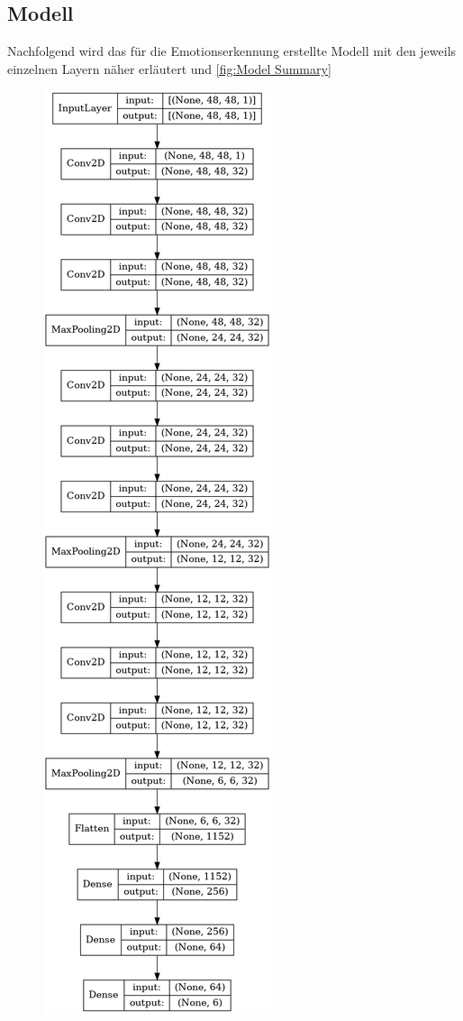 \documentclass[12pt, a4paper]{scrbook}
\begin{document}
\subsection{Modell}
Nachfolgend wird das für die Emotionserkennung erstellte Modell mit den jeweils einzelnen Layern näher erläutert und \ref{fig:Model Summary}
\begin{figure}[h]
\includegraphics[viewport=0 1177 300 1844]{Bilder/ModelSummary.png}
\end{figure}
\end{document}
